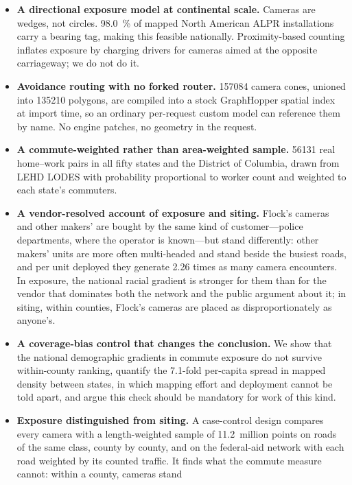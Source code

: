 \documentclass[11pt,twoside]{article}
\newcommand{\alpr}{ALPR\xspace}
\begin{document}
\begin{itemize}
  \item \textbf{A directional exposure model at continental scale.} Cameras are wedges,
    not circles. \SI{98.0}{\percent} of mapped North American \alpr installations carry a
    bearing tag, making this feasible nationally. Proximity-based counting inflates
    exposure by charging drivers for cameras aimed at the opposite carriageway; we do not
    do it.
  \item \textbf{Avoidance routing with no forked router.} \num{157084} camera cones, unioned
    into \num{135210} polygons, are compiled into a stock GraphHopper spatial index at import
    time, so an ordinary per-request custom model can reference them by name. No engine
    patches, no geometry in the request.
  \item \textbf{A commute-weighted rather than area-weighted sample.} \num{56131} real
    home--work pairs in all fifty states and the District of Columbia, drawn from LEHD
    LODES with probability proportional to worker count and weighted to each state's
    commuters.
  \item \textbf{A vendor-resolved account of exposure and siting.} Flock's cameras and
    other makers' are bought by the same kind of customer---police departments, where the
    operator is known---but stand differently: other makers' units are more often multi-headed
    and stand beside the busiest roads, and per unit deployed they generate 2.26 times as many
    camera encounters. In exposure, the national racial gradient is stronger for them than for the vendor
    that dominates both the network and the public argument about it; in siting, within
    counties, Flock's cameras are placed as disproportionately as anyone's.
  \item \textbf{A coverage-bias control that changes the conclusion.} We show that the
    national demographic gradients in commute exposure do not survive within-county ranking,
    quantify the \num{7.1}-fold per-capita spread in mapped density between states, in which
    mapping effort and deployment cannot be told apart, and argue this check should be
    mandatory for work of this kind.
  \item \textbf{Exposure distinguished from siting.} A case-control design compares every
    camera with a length-weighted sample of \num{11.2}~million points on roads of the same
    class, county by county, and on the federal-aid network with each road weighted by its
    counted traffic. It finds what the commute measure cannot: within a county, cameras stand

\end{itemize}
\end{document}
